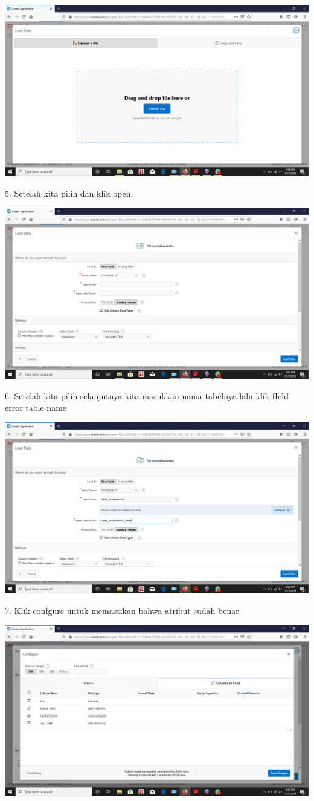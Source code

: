\documentclass{article}
\begin{document}
\begin{center}
    \includegraphics[width=10cm\textwidth]{gambar/3.png}
 \end{center}
 \newpage
 \item 5. Setelah kita pilih dan klik open.
\begin{center}
 \includegraphics[width=10cm\textwidth]{gambar/5.png}
\end{center}
 \item 6. Setelah kita pilih selanjutnya kita masukkan nama tabelnya lalu klik fIeld error table name
\begin{center}
 \includegraphics[width=10cm\textwidth]{gambar/6.png}
\end{center}
\newpage
\item 7. Klik confgure untuk memastikan bahwa atribut sudah benar
\begin{center}
 \includegraphics[width=10cm\textwidth]{gambar/7.png}
\end{center}
\end{document}
